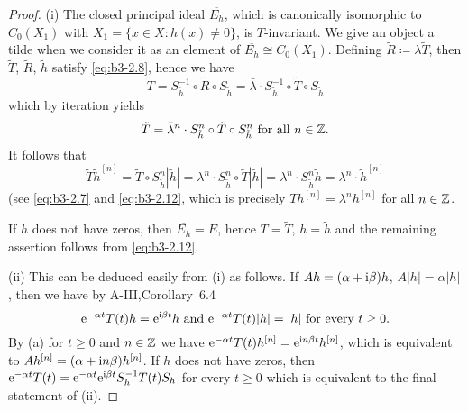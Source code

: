 \begin{proof}
	(i) The closed principal ideal $\overline{E_{h}}$, which is canonically isomorphic to $C_{0}(X_{1})$ with $X_{1} = \{x \in X \colon h(x) \neq 0\}$, is $T$-invariant.
	We give an object a tilde when we consider it as an element of $\overline{E_{h}} \cong C_{0}(X_{1})$.
	Defining $\tilde{R} \coloneqq \lambda\tilde{T}$, then $\tilde{T}$, $\tilde{R}$, $\tilde{h}$ satisfy \eqref{eq:b3-2.8}, hence we have
	\begin{equation}\label{eq:b3-2.12}
		\tilde{T} = S_{\tilde{h}}^{-1} \circ \tilde{R} \circ S_{\tilde{h}} = \bar{\lambda} \cdot S_{\tilde{h}}^{-1} \circ \tilde{T} \circ S_{\tilde{h}}
	\end{equation}
	which by iteration yields
	\begin{equation}\label{eq:b3-2.13}
		\tilde{T} = \bar{\lambda}^{n} \cdot S_{\tilde{h}}^{n} \circ \tilde{T} \circ S_{\tilde{h}}^{n} \text{ for all } n \in \mathbb{Z}.
	\end{equation}
	It follows that
		\begin{equation*}
		\tilde{T}\tilde{h}^{[n]} = \tilde{T} \circ S_{\tilde{h}}^{n}|\tilde{h}| = \lambda^{n} \cdot S_{\tilde{h}}^{n} \circ \tilde{T}|\tilde{h}| 
		= \lambda^{n} \cdot S_{\tilde{h}}^{n}\tilde{h} = \lambda^{n} \cdot \tilde{h}^{[n]}
	\end{equation*}
	(see \eqref{eq:b3-2.7} and \eqref{eq:b3-2.12}, which is precisely $Th^{[n]} = \lambda^{n}h^{[n]}$ for all $n \in \mathbb{Z}$.
	
	If $h$ does not have zeros, then $\overline{E_{h}} = E$, hence $T = \tilde{T}$, $h = \tilde{h}$ and the remaining assertion follows from \eqref{eq:b3-2.12}.

	(ii) This can be deduced easily from (i) as follows. 
	If $Ah = (\alpha+\mathrm{i}\beta )h$, $A|h| = \alpha|h|$, then we have by A-III,Corollary~6.4
	\[
	\mathrm{e}^{-\alpha t}T(t)h = \mathrm{e}^{\mathrm{i}\beta  t}h \text{ and } \mathrm{e}^{-\alpha t}T(t)|h| = |h| \text{ for every } t \geq 0.
	\]
	By (a) for $t \geq 0$ and $n \in \mathbb{Z}$ we have
    $\mathrm{e}^{-\alpha t}T(t)h^{[n]} = \mathrm{e}^{\mathrm{i} n\beta t}h^{[n]}$, which is equivalent to $Ah^{[n]} = (\alpha+\mathrm{i} n\beta)h^{[n]}$.
	If $h$ does not have zeros, then $\mathrm{e}^{-\alpha t}T(t) = \mathrm{e}^{-\alpha t}\mathrm{e}^{\mathrm{i}\beta  t}S_{h}^{-1}T(t)S_{h}$ for every $t \geq 0$ which is equivalent to the final statement of (ii).
	\end{proof}
